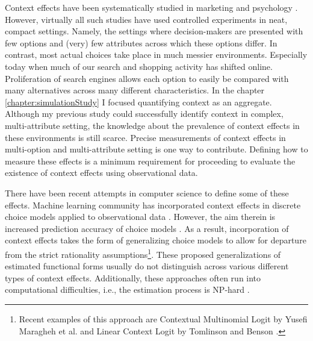 \documentclass[a4paper,12pt]{article}
\newcommand{\citeyearonly}[1]{\citeyearpar{#1}}
\begin{document}
Context effects have been systematically studied in marketing and psychology \citep{kivetz04, roodrkerkEtAl11, frederickEtAl14, dotsonEtAl18}. However, virtually all such studies have used controlled experiments in neat, compact settings. Namely, the settings where decision-makers are presented with few options and (very) few attributes across which these options differ. In contrast, most actual choices take place in much messier environments. Especially today when much of our search and shopping activity has shifted online. Proliferation of search engines allows each option to easily be compared with many alternatives across many different characteristics. In the chapter \ref{chapter:simulationStudy} I focused quantifying context as an aggregate. Although my previous study could successfully identify context in complex, multi-attribute setting,  the knowledge about the prevalence of context effects in these environments is still scarce. Precise measurements of context effects in multi-option and multi-attribute setting is one way to contribute. Defining how to measure these effects is a minimum requirement for proceeding to evaluate the existence of context effects using observational data.

There have been recent attempts in computer science to define some of these effects. Machine learning community has incorporated context effects in discrete choice models applied to observational data \citep{pfannschmidt2019learning, bowerBalzano20}. However, the aim therein is increased prediction accuracy of choice models \citep{tomlinsonBenson21}. As a result, incorporation of context effects takes the form of generalizing choice models to allow for departure from the strict rationality assumptions\footnote{Recent examples of this approach are  Contextual Multinomial Logit by Yusefi Maragheh et al. \citeyearonly{yousefi2020choice} and Linear Context Logit by Tomlinson and Benson \citeyearonly{tomlinsonBenson21}.}. These proposed generalizations of estimated functional forms usually do not distinguish across various different types of context effects. Additionally, these approaches often run into computational difficulties, i.e., the estimation process is NP-hard \citep{yousefi2020choice}.
\end{document}
